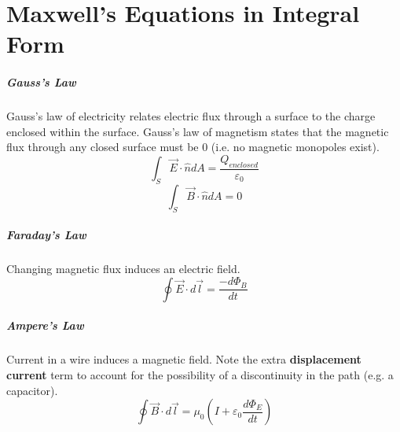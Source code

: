 \documentclass[11pt]{article}
\begin{document}
\section{Maxwell's Equations in Integral Form}
	\subparagraph{Gauss's Law} Gauss's law of electricity relates electric flux through a surface to the charge enclosed within the surface. Gauss's law of magnetism states that the magnetic flux through any closed surface must be 0 (i.e. no magnetic monopoles exist).
	\begin{equation}
		\int_S \vec{E} \cdot \hat{n} dA = \frac{Q_{enclosed}}{\varepsilon_0}
	\end{equation}
	\begin{equation}
		\int_S \vec{B} \cdot \hat{n} dA = 0
	\end{equation}
	
	\subparagraph{Faraday's Law} Changing magnetic flux induces an electric field.
	\begin{equation}
		\oint \vec{E} \cdot d\vec{l} = \frac{-d\Phi_B}{dt}
	\end{equation}
	
	\subparagraph{Ampere's Law} Current in a wire induces a magnetic field. Note the extra \textbf{displacement current} term to account for the possibility of a discontinuity in the path (e.g. a capacitor).
	\begin{equation}
		\oint \vec{B} \cdot d\vec{l} = \mu_0 \left( I + \varepsilon_0 \frac{d\Phi_E}{dt} \right)
	\end{equation}
	
\end{document}
